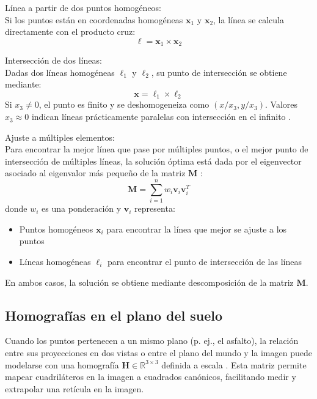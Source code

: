 Línea a partir de dos puntos homogéneos:\\
Si los puntos están en coordenadas homogéneas $\mathbf{x}_1$ y $\mathbf{x}_2$, la línea se calcula directamente con el producto cruz:
\begin{equation}
	\ell = \mathbf{x}_1 \times \mathbf{x}_2
\end{equation}

Intersección de dos líneas:\\
Dadas dos líneas homogéneas $\ell_1$ y $\ell_2$, su punto de intersección se obtiene mediante:
\begin{equation}
	\mathbf{x} = \ell_1 \times \ell_2
\end{equation}
Si $x_3 \neq 0$, el punto es finito y se deshomogeneiza como $(x/x_3, y/x_3)$. Valores $x_3 \approx 0$ indican líneas prácticamente paralelas con intersección en el infinito \cite{hartley2003multiple}.

Ajuste a múltiples elementos: \label{sec:ajuste-multiples-elementos} \\
Para encontrar la mejor línea que pase por múltiples puntos, o el mejor punto de intersección de múltiples líneas, la solución óptima está dada por el eigenvector asociado al eigenvalor más pequeño de la matriz $\mathbf{M}$ \cite{kanatani1998statistical}:
\begin{equation}
	\mathbf{M} = \sum_{i=1}^{n} w_i \mathbf{v}_i \mathbf{v}_i^T
\end{equation}
donde $w_i$ es una ponderación y $\mathbf{v}_i$ representa:
\begin{itemize}
	\item Puntos homogéneos $\mathbf{x}_i$ para encontrar la línea que mejor se ajuste a los puntos
	\item Líneas homogéneas $\ell_i$ para encontrar el punto de intersección de las líneas
\end{itemize}
En ambos casos, la solución se obtiene mediante descomposición de la matriz $\mathbf{M}$.

\subsection{Homografías en el plano del suelo}\label{subsec:homografias}

Cuando los puntos pertenecen a un mismo plano (p. ej., el asfalto),
la relación entre sus proyecciones en dos vistas o entre el plano del mundo
y la imagen puede modelarse con una homografía
\(\mathbf{H}\in\mathbb{R}^{3\times3}\)
definida a escala \cite{hartley2003multiple}.
Esta matriz permite mapear cuadriláteros en la imagen a cuadrados canónicos,
facilitando medir y extrapolar una retícula en la imagen.

